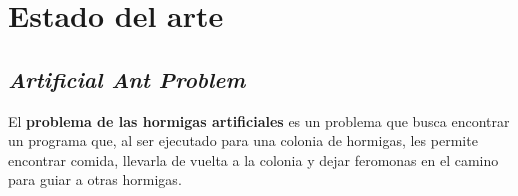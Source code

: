 \section{Estado del arte}
  \subsection{\textit{Artificial Ant Problem}}
    El \textbf{problema de las hormigas artificiales} \autocite{kozaGeneticProgrammingMeans1994} es 
    un problema que busca encontrar un programa que, al ser ejecutado para una colonia de hormigas, 
    les permite encontrar comida, llevarla de vuelta a la colonia y dejar feromonas en el camino 
    para guiar a otras hormigas.
 